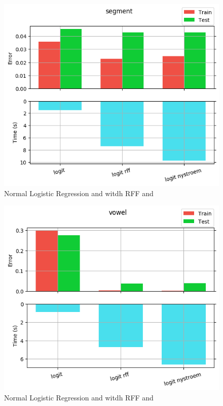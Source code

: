 \begin{figure}[th]
\centering
\includegraphics[scale=\imgscale]{Figures/2_1/segment}
\decoRule
\caption[2.1 segment]{Normal Logistic Regression and witdh RFF and \Nys}
\label{fig:2_1_segment}
\end{figure}

\begin{figure}[th]
\centering
\includegraphics[scale=\imgscale]{Figures/2_1/vowel}
\decoRule
\caption[2.1 vowel]{Normal Logistic Regression and witdh RFF and \Nys}
\label{fig:vowel}
\end{figure}
